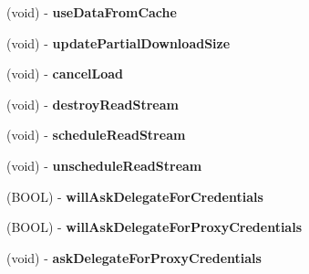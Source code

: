 \begin{DoxyCompactItemize}
\item 
\hypertarget{interface_a_s_i_h_t_t_p_request_07_08_a7cd96b5cbd524b2110451f6ff7b36f85}{
(void) -\/ {\bfseries use\-Data\-From\-Cache}}
\label{interface_a_s_i_h_t_t_p_request_07_08_a7cd96b5cbd524b2110451f6ff7b36f85}

\item 
\hypertarget{interface_a_s_i_h_t_t_p_request_07_08_aa1a2623d26fc118ae099a6325444a2f4}{
(void) -\/ {\bfseries update\-Partial\-Download\-Size}}
\label{interface_a_s_i_h_t_t_p_request_07_08_aa1a2623d26fc118ae099a6325444a2f4}

\item 
\hypertarget{interface_a_s_i_h_t_t_p_request_07_08_ad64a88ff354a1e9acd0e50f6bd6383af}{
(void) -\/ {\bfseries cancel\-Load}}
\label{interface_a_s_i_h_t_t_p_request_07_08_ad64a88ff354a1e9acd0e50f6bd6383af}

\item 
\hypertarget{interface_a_s_i_h_t_t_p_request_07_08_ab3dbbd41ced7e54f058267aaa2e80150}{
(void) -\/ {\bfseries destroy\-Read\-Stream}}
\label{interface_a_s_i_h_t_t_p_request_07_08_ab3dbbd41ced7e54f058267aaa2e80150}

\item 
\hypertarget{interface_a_s_i_h_t_t_p_request_07_08_a9298c802e2cd503d0f3ae6f508f59e52}{
(void) -\/ {\bfseries schedule\-Read\-Stream}}
\label{interface_a_s_i_h_t_t_p_request_07_08_a9298c802e2cd503d0f3ae6f508f59e52}

\item 
\hypertarget{interface_a_s_i_h_t_t_p_request_07_08_a036ae593e23c948377acca2d405ab265}{
(void) -\/ {\bfseries unschedule\-Read\-Stream}}
\label{interface_a_s_i_h_t_t_p_request_07_08_a036ae593e23c948377acca2d405ab265}

\item 
\hypertarget{interface_a_s_i_h_t_t_p_request_07_08_a2fb19d10e5d6449c7845042add6dc2a1}{
(\-B\-O\-O\-L) -\/ {\bfseries will\-Ask\-Delegate\-For\-Credentials}}
\label{interface_a_s_i_h_t_t_p_request_07_08_a2fb19d10e5d6449c7845042add6dc2a1}

\item 
\hypertarget{interface_a_s_i_h_t_t_p_request_07_08_a52ecd8ea9d13c585c86a7f9031f1d2e8}{
(\-B\-O\-O\-L) -\/ {\bfseries will\-Ask\-Delegate\-For\-Proxy\-Credentials}}
\label{interface_a_s_i_h_t_t_p_request_07_08_a52ecd8ea9d13c585c86a7f9031f1d2e8}

\item 
\hypertarget{interface_a_s_i_h_t_t_p_request_07_08_a545869781fbd1e24ed126da754536006}{
(void) -\/ {\bfseries ask\-Delegate\-For\-Proxy\-Credentials}}
\label{interface_a_s_i_h_t_t_p_request_07_08_a545869781fbd1e24ed126da754536006}


\end{DoxyCompactItemize}
